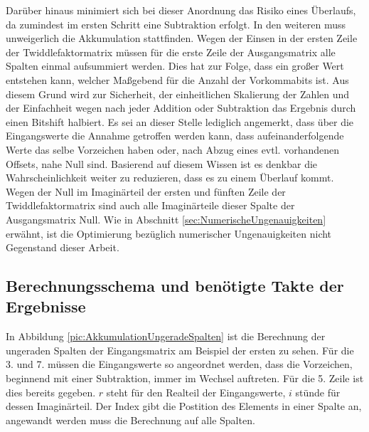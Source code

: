  Darüber hinaus minimiert sich bei dieser Anordnung das Risiko eines Überlaufs, da zumindest im ersten Schritt eine Subtraktion erfolgt. In den weiteren muss unweigerlich die 
 Akkumulation stattfinden. 
 Wegen der Einsen in der ersten Zeile der Twiddlefaktormatrix müssen für die erste Zeile der Ausgangsmatrix alle Spalten einmal aufsummiert werden.
 Dies hat zur Folge, dass ein großer Wert entstehen kann, welcher Maßgebend für die Anzahl der Vorkommabits ist.
 Aus diesem Grund wird zur Sicherheit, der einheitlichen Skalierung der Zahlen und der Einfachheit wegen nach jeder Addition oder Subtraktion das Ergebnis durch einen Bitshift halbiert. 
 Es sei an dieser Stelle lediglich angemerkt, dass über die Eingangswerte die Annahme getroffen werden kann, dass aufeinanderfolgende Werte das selbe Vorzeichen haben oder, nach Abzug eines evtl. vorhandenen Offsets, nahe Null sind. 
 Basierend auf diesem Wissen ist es denkbar die Wahrscheinlichkeit weiter zu reduzieren, dass es zu einem Überlauf kommt. 
Wegen der Null im Imaginärteil der ersten und fünften Zeile der Twiddlefaktormatrix sind auch alle Imaginärteile dieser Spalte der Ausgangsmatrix Null.
Wie in Abschnitt \ref{sec:NumerischeUngenauigkeiten} erwähnt, ist die Optimierung bezüglich numerischer Ungenauigkeiten nicht Gegenstand dieser Arbeit.

 
 
\subsection{Berechnungsschema und benötigte Takte der Ergebnisse}\label{sec:Berechnungsschema}

In Abbildung \ref{pic:AkkumulationUngeradeSpalten} ist die Berechnung der ungeraden Spalten der Eingangsmatrix am Beispiel der ersten zu sehen. Für die 3. und 7. müssen die 
Eingangswerte so angeordnet werden, dass die Vorzeichen, beginnend mit einer Subtraktion, immer im Wechsel auftreten. Für die 5. Zeile ist dies bereits gegeben.
$r$ steht für den Realteil der Eingangswerte, $i$ stünde für dessen Imaginärteil. Der Index gibt die Postition des Elements in einer Spalte an, angewandt werden muss die
Berechnung auf alle Spalten.


